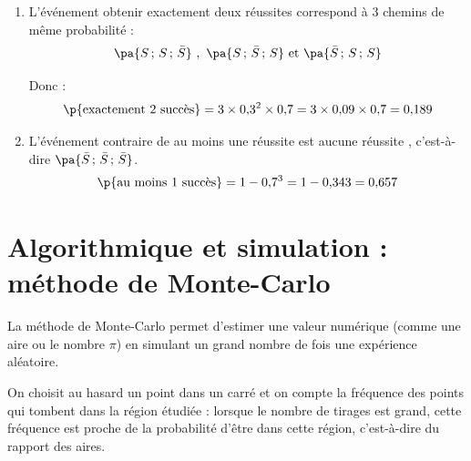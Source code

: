 \begin{methode}
\begin{correction}
\begin{enumerate}
			\item L'événement \og obtenir exactement deux réussites \fg{} correspond à $3$ chemins de même probabilité :
			      \[
				      \pa{S\,;\,S\,;\,\bar{S}}\ ,\ \pa{S\,;\,\bar{S}\,;\,S}\ \text{et}\ \pa{\bar{S}\,;\,S\,;\,S}
			      \]

			      Donc :
			      \[
				      \p{\text{exactement } 2 \text{ succès}} = 3 \times 0{,}3^2 \times 0{,}7 = 3 \times 0{,}09 \times 0{,}7 = 0{,}189
			      \]

			\item L'événement contraire de \og au moins une réussite \fg{} est \og aucune réussite \fg{}, c'est-à-dire $\pa{\bar{S}\,;\,\bar{S}\,;\,\bar{S}}$.
			      \[
				      \p{\text{au moins } 1 \text{ succès}} = 1 - 0{,}7^3 = 1 - 0{,}343 = 0{,}657
			      \]
		\end{enumerate}
	\end{correction}
\end{methode}

\section{Algorithmique et simulation : méthode de Monte-Carlo}

La méthode de Monte-Carlo permet d'estimer une valeur numérique (comme une aire ou le nombre $\pi$) en simulant un grand nombre de fois une expérience aléatoire.

On choisit au hasard un point dans un carré et on compte la fréquence des points qui tombent dans la région étudiée : lorsque le nombre de tirages est grand, cette fréquence est proche de la probabilité d'être dans cette région, c'est-à-dire du rapport des aires.

\newpage

